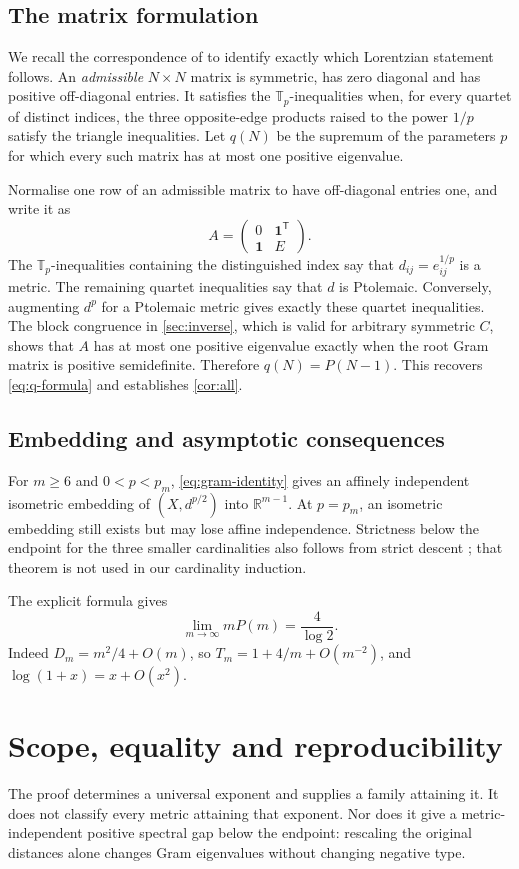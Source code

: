 \documentclass[11pt,a4paper]{article}
\theoremstyle{definition}
\theoremstyle{remark}
\numberwithin{equation}{section}
\newcommand{\one}{\mathbf 1}
\newcommand{\R}{\mathbb R}
\newcommand{\tr}{^{\mathsf T}}
\begin{document}
\subsection{The matrix formulation}
We recall the correspondence of \citet[Proposition 7.5]{bhkl} to identify exactly which Lorentzian statement follows. An \emph{admissible} $N\times N$ matrix is symmetric, has zero diagonal and has positive off-diagonal entries. It satisfies the $\mathbb T_p$-inequalities when, for every quartet of distinct indices, the three opposite-edge products raised to the power $1/p$ satisfy the triangle inequalities. Let $q(N)$ be the supremum of the parameters $p$ for which every such matrix has at most one positive eigenvalue.

Normalise one row of an admissible matrix to have off-diagonal entries one, and write it as
\[
 A=\begin{pmatrix}0&\one\tr\\\one&E\end{pmatrix}.
\]
The $\mathbb T_p$-inequalities containing the distinguished index say that $d_{ij}=e_{ij}^{1/p}$ is a metric. The remaining quartet inequalities say that $d$ is Ptolemaic. Conversely, augmenting $d^p$ for a Ptolemaic metric gives exactly these quartet inequalities. The block congruence in \cref{sec:inverse}, which is valid for arbitrary symmetric $C$, shows that $A$ has at most one positive eigenvalue exactly when the root Gram matrix is positive semidefinite. Therefore $q(N)=P(N-1)$. This recovers \eqref{eq:q-formula} and establishes \cref{cor:all}.

\subsection{Embedding and asymptotic consequences}
For $m\ge6$ and $0<p<p_m$, \eqref{eq:gram-identity} gives an affinely independent isometric embedding of $(X,d^{p/2})$ into $\R^{m-1}$. At $p=p_m$, an isometric embedding still exists but may lose affine independence. Strictness below the endpoint for the three smaller cardinalities also follows from strict descent \citep{liweston}; that theorem is not used in our cardinality induction.

The explicit formula gives
\[
 \lim_{m\to\infty}mP(m)=\frac4{\log 2}.
\]
Indeed $D_m=m^2/4+O(m)$, so $T_m=1+4/m+O(m^{-2})$, and $\log(1+x)=x+O(x^2)$.

\section{Scope, equality and reproducibility}\label{sec:scope}
The proof determines a universal exponent and supplies a family attaining it. It does not classify every metric attaining that exponent. Nor does it give a metric-independent positive spectral gap below the endpoint: rescaling the original distances alone changes Gram eigenvalues without changing negative type.
\end{document}
